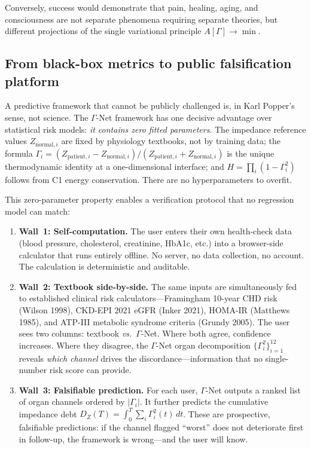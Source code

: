 \documentclass[aps,pre,twocolumn,superscriptaddress,floatfix]{revtex4-2}
\begin{document}
Conversely, success would demonstrate that
pain, healing, aging, and consciousness are not
separate phenomena requiring separate theories, but
different projections of the single variational
principle $A[\Gamma]\to\min$.


\subsection{From black-box metrics to public falsification platform}
\label{sec:falsification-platform}

A predictive framework that cannot be publicly challenged is, in
Karl Popper's sense, not science.  The $\Gamma$-Net framework has
one decisive advantage over statistical risk models:
\emph{it contains zero fitted parameters}.  The impedance reference
values $Z_{\text{normal},i}$ are fixed by physiology textbooks, not
by training data; the formula
$\Gamma_i = (Z_{\text{patient},i} - Z_{\text{normal},i}) /
(Z_{\text{patient},i} + Z_{\text{normal},i})$ is the unique
thermodynamic identity at a one-dimensional interface; and
$H = \prod_i (1 - \Gamma_i^2)$ follows from C1 energy conservation.
There are no hyperparameters to overfit.

This zero-parameter property enables a verification protocol that
no regression model can match:

\begin{enumerate}
  \item \textbf{Wall~1: Self-computation.}
    The user enters their own health-check data (blood pressure,
    cholesterol, creatinine, HbA1c, etc.) into a browser-side
    calculator that runs entirely offline.  No server, no data
    collection, no account.  The calculation is deterministic and
    auditable.

  \item \textbf{Wall~2: Textbook side-by-side.}
    The same inputs are simultaneously fed to established clinical
    risk calculators---Framingham 10-year CHD risk (Wilson 1998),
    CKD-EPI 2021 eGFR (Inker 2021), HOMA-IR (Matthews 1985), and
    ATP-III metabolic syndrome criteria (Grundy 2005).  The user
    sees two columns: textbook \emph{vs.}\ $\Gamma$-Net.
    Where both agree, confidence increases.  Where they disagree,
    the $\Gamma$-Net organ decomposition
    $\{\Gamma_i^2\}_{i=1}^{12}$ reveals \emph{which channel}
    drives the discordance---information that no single-number
    risk score can provide.

  \item \textbf{Wall~3: Falsifiable prediction.}
    For each user, $\Gamma$-Net outputs a ranked list of organ
    channels ordered by $|\Gamma_i|$.  It further predicts
    the cumulative impedance debt
    $D_Z(T) = \int_0^T \sum_i \Gamma_i^2(t)\,dt$.  These are
    prospective, falsifiable predictions: if the channel flagged
    ``worst'' does not deteriorate first in follow-up, the
    framework is wrong---and the user will know.
\end{enumerate}
\end{document}
